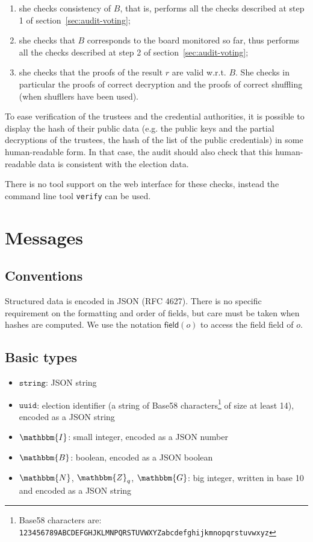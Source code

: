 \documentclass[a4paper]{article}
\newcommand{\G}{\mathbbm{G}}
\newcommand{\Z}{\mathbbm{Z}}
\newcommand{\N}{\mathbbm{N}}
\newcommand{\I}{\mathbbm{I}}
\newcommand{\B}{\mathbbm{B}}
\newcommand{\jstring}{\texttt{string}}
\newcommand{\uuid}{\texttt{uuid}}
\begin{document}
  \begin{enumerate}
  \item she checks consistency of $B$, that is, performs all
    the checks described at step 1 of section~\ref{sec:audit-voting};
  \item she checks that $B$ corresponds to the board
      monitored so far, thus performs all
    the checks described at step 2 of section~\ref{sec:audit-voting};
  \item she checks that the proofs of the result $r$ are valid
    w.r.t. $B$.
She checks in particular the proofs of correct decryption and the
proofs of correct shuffling (when shufllers have been used).
\end{enumerate}
To ease verification of the trustees and the credential authorities,
it is possible to display the hash of their public data (e.g. the
public keys and the partial decryptions of the trustees, the hash of
the list of the public credentials) in some human-readable form. In
that case, the audit should also check that this human-readable data is
consistent with the election data.

There is no tool support on the web interface for these checks,
instead the command line tool \texttt{verify} can be used.

\section{Messages}
\label{messages}

\subsection{Conventions}

Structured data is encoded in JSON (RFC 4627). There is no specific
requirement on the formatting and order of fields, but care must be
taken when hashes are computed. We use the notation
$\textsf{field}(o)$ to access the field \textsf{field} of $o$.

\subsection{Basic types}
\label{basic-types}

\begin{itemize}
\item $\jstring$: JSON string
\item $\uuid$: election identifier (a string of
  Base58 characters\footnote{Base58 characters are:
    \texttt{123456789ABCDEFGHJKLMNPQRSTUVWXYZabcdefghijkmnopqrstuvwxyz}}
  of size at least 14), encoded as a JSON string
\item $\I$: small integer, encoded as a JSON number
\item $\B$: boolean, encoded as a JSON boolean
\item $\N$, $\Z_q$, $\G$: big integer, written in base 10 and encoded as a
  JSON string
\end{itemize}
\end{document}
